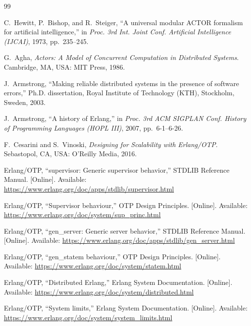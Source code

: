 \documentclass[conference,letterpaper]{IEEEtran}
\begin{document}
\begin{thebibliography}{99}
\footnotesize

C.~Hewitt, P.~Bishop, and R.~Steiger, ``A universal modular ACTOR formalism
for artificial intelligence,'' in \emph{Proc. 3rd Int. Joint Conf.
Artificial Intelligence (IJCAI)}, 1973, pp.~235--245.

G.~Agha, \emph{Actors: A Model of Concurrent Computation in Distributed
Systems}. Cambridge, MA, USA: MIT Press, 1986.

J.~Armstrong, ``Making reliable distributed systems in the presence of
software errors,'' Ph.D. dissertation, Royal Institute of Technology (KTH),
Stockholm, Sweden, 2003.

J.~Armstrong, ``A history of Erlang,'' in \emph{Proc. 3rd ACM SIGPLAN Conf.
History of Programming Languages (HOPL III)}, 2007, pp.~6-1--6-26.

F.~Cesarini and S.~Vinoski, \emph{Designing for Scalability with
Erlang/OTP}. Sebastopol, CA, USA: O'Reilly Media, 2016.

Erlang/OTP, ``supervisor: Generic supervisor behavior,'' STDLIB Reference
Manual. [Online]. Available:
\url{https://www.erlang.org/doc/apps/stdlib/supervisor.html}

Erlang/OTP, ``Supervisor behaviour,'' OTP Design Principles. [Online].
Available: \url{https://www.erlang.org/doc/system/sup_princ.html}

Erlang/OTP, ``gen\_server: Generic server behavior,'' STDLIB Reference
Manual. [Online]. Available:
\url{https://www.erlang.org/doc/apps/stdlib/gen_server.html}

Erlang/OTP, ``gen\_statem behaviour,'' OTP Design Principles. [Online].
Available: \url{https://www.erlang.org/doc/system/statem.html}

Erlang/OTP, ``Distributed Erlang,'' Erlang System Documentation. [Online].
Available: \url{https://www.erlang.org/doc/system/distributed.html}

Erlang/OTP, ``System limits,'' Erlang System Documentation. [Online].
Available: \url{https://www.erlang.org/doc/system/system_limits.html}


\end{thebibliography}
\end{document}
